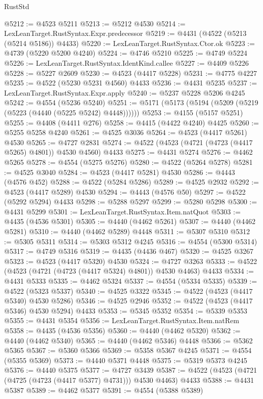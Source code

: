 \begin{lexlean}{RustStd}
\begin{coremodule}
@5212 := @4523 @5211
@5213 := @5212 @4530
@5214 := LexLeanTarget.RustSyntax.Expr.predecessor
@5219 := @4431 (@4522 (@5213 (@5214 @5186)) @4433)
@5220 := LexLeanTarget.RustSyntax.Ctor.ok
@5223 := @4739 (@5220 @5200 @4240)
@5224 := @4746 @5210
@5225 := @4749 @5224
@5226 := LexLeanTarget.RustSyntax.IdentKind.callee
@5227 := @4409 @5226
@5228 := @5227 @2609
@5230 := @4523 (@4417 @5228)
@5231 := @4775 @4227
@5235 := @4522 (@5230 @5231 @4560) @4433
@5236 := @4431 @5235
@5237 := LexLeanTarget.RustSyntax.Expr.apply
@5240 := @5237 @5228 @5206 @4245
@5242 := @4554 (@5236 @5240)
@5251 := @5171 (@5173 (@5194 (@5209 (@5219 (@5223 (@4440 (@5225 @5242) @4448))))))
@5253 := @4155 (@5157 @5251)
@5255 := @4408 (@4411 @276)
@5258 := @4415 (@4422 @4240) @4425
@5260 := @5255 @5258 @4240
@5261 := @4525 @3036
@5264 := @4523 (@4417 @5261) @4530
@5265 := @4727 @2831
@5274 := @4522 (@4523 (@4721 (@4723 (@4417 @5265) @4801)) @4530 @4560) @4433
@5275 := @4431 @5274
@5276 := @4462 @5265
@5278 := @4554 (@5275 @5276)
@5280 := @4522 (@5264 @5278)
@5281 := @4525 @3040
@5284 := @4523 (@4417 @5281) @4530
@5286 := @4443 (@4576 @452)
@5288 := @4522 (@5284 @5286)
@5289 := @4525 @2932
@5292 := @4523 (@4417 @5289) @4530
@5294 := @4443 (@4576 @50)
@5297 := @4522 (@5292 @5294) @4433
@5298 := @5288 @5297
@5299 := @5280 @5298
@5300 := @4431 @5299
@5301 := LexLeanTarget.RustSyntax.Item.natQuot
@5303 := @4435 (@4536 @5301)
@5305 := @4440 (@4462 @5261)
@5307 := @4440 (@4462 @5281)
@5310 := @4440 (@4462 @5289) @4448
@5311 := @5307 @5310
@5312 := @5305 @5311
@5314 := @5303 @5312 @4245
@5316 := @4554 (@5300 @5314)
@5317 := @4749 @5316
@5319 := @4435 (@4436 @467)
@5320 := @4525 @3267
@5323 := @4523 (@4417 @5320) @4530
@5324 := @4727 @3263
@5333 := @4522 (@4523 (@4721 (@4723 (@4417 @5324) @4801)) @4530 @4463) @4433
@5334 := @4431 @5333
@5335 := @4462 @5324
@5337 := @4554 (@5334 @5335)
@5339 := @4522 (@5323 @5337)
@5340 := @4525 @3322
@5345 := @4522 (@4523 (@4417 @5340) @4530 @5286)
@5346 := @4525 @2946
@5352 := @4522 (@4523 (@4417 @5346) @4530 @5294) @4433
@5353 := @5345 @5352
@5354 := @5339 @5353
@5355 := @4431 @5354
@5356 := LexLeanTarget.RustSyntax.Item.natRem
@5358 := @4435 (@4536 @5356)
@5360 := @4440 (@4462 @5320)
@5362 := @4440 (@4462 @5340)
@5365 := @4440 (@4462 @5346) @4448
@5366 := @5362 @5365
@5367 := @5360 @5366
@5369 := @5358 @5367 @4245
@5371 := @4554 (@5355 @5369)
@5373 := @4440 @5371 @4448
@5375 := @5319 @5373 @4245
@5376 := @4440 @5375
@5377 := @4727 @3439
@5387 := @4522 (@4523 (@4721 (@4725 (@4723 (@4417 @5377) @4731))) @4530 @4463) @4433
@5388 := @4431 @5387
@5389 := @4462 @5377
@5391 := @4554 (@5388 @5389)

\end{coremodule}
\end{lexlean}

